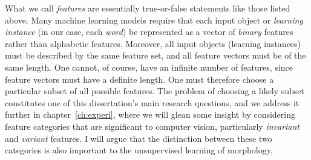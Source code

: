 What we call \emph{features} are essentially true-or-false statements like those listed above.
Many machine learning models require that each input object or \emph{learning instance} 
(in our case, each \emph{word}) be represented as a vector of \emph{binary} features rather than alphabetic 
features. Moreover, all input objects (learning instances) must be described by the same feature 
set, and all feature vectors must be of the same length.
One cannot, of course, have an infinite number of features, since feature vectors must have a definite length.
One must therefore choose a particular subset of all possible features. The problem of choosing a likely subset constitutes one of
this dissertation's main research questions, and we
address it further in chapter~\ref{ch:experi}, where we will glean some insight 
by considering feature categories that 
are significant to computer vision, particularly \emph{invariant} and \emph{variant} features. I will argue that the distinction between these two categories is also important to the unsupervised learning of morphology.


